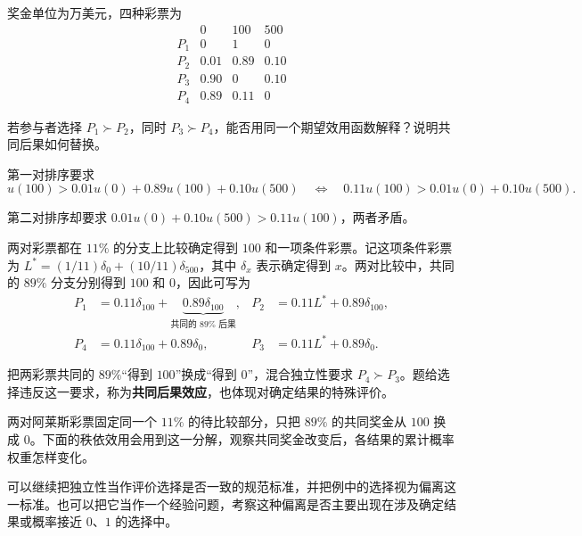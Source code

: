 \begin{tcolorbox}[example,title=课堂例题：两对抽奖的选择]
\begin{question}
奖金单位为万美元，四种彩票为
\[
\begin{array}{c|ccc}
 &0&100&500\\\hline
 P_1&0&1&0\\
 P_2&0.01&0.89&0.10\\
 P_3&0.90&0&0.10\\
 P_4&0.89&0.11&0
\end{array}
\]

若参与者选择 $P_1\succ P_2$，同时 $P_3\succ P_4$，能否用同一个期望效用函数解释？说明共同后果如何替换。
\end{question}
\begin{solution}[blank-type=manual,blank-vsep=6\baselineskip]
第一对排序要求
\[
 u(100)>0.01u(0)+0.89u(100)+0.10u(500)
 \quad\Longleftrightarrow\quad
 0.11u(100)>0.01u(0)+0.10u(500).
\]

第二对排序却要求 $0.01u(0)+0.10u(500)>0.11u(100)$，两者矛盾。

两对彩票都在 $11\%$ 的分支上比较确定得到 $100$ 和一项条件彩票。记这项条件彩票为 $L^\ast=(1/11)\delta_0+(10/11)\delta_{500}$，其中 $\delta_x$ 表示确定得到 $x$。两对比较中，共同的 $89\%$ 分支分别得到 $100$ 和 $0$，因此可写为
\[
\begin{aligned}
 P_1&=0.11\delta_{100}+\underbrace{0.89\delta_{100}}_{\text{共同的 }89\%\text{ 后果}},&
 P_2&=0.11L^\ast+0.89\delta_{100},\\
 P_4&=0.11\delta_{100}+0.89\delta_0,&
 P_3&=0.11L^\ast+0.89\delta_0.
\end{aligned}
\]

\begin{center}
\end{center}

把两彩票共同的 $89\%$“得到 $100$”换成“得到 $0$”，混合独立性要求 $P_4\succ P_3$。题给选择违反这一要求，称为\textbf{共同后果效应}，也体现对确定结果的特殊评价。
\end{solution}
\end{tcolorbox}

两对阿莱斯彩票固定同一个 $11\%$ 的待比较部分，只把 $89\%$ 的共同奖金从 $100$ 换成 $0$。下面的秩依效用会用到这一分解，观察共同奖金改变后，各结果的累计概率权重怎样变化。

可以继续把独立性当作评价选择是否一致的规范标准，并把例中的选择视为偏离这一标准。也可以把它当作一个经验问题，考察这种偏离是否主要出现在涉及确定结果或概率接近 $0$、$1$ 的选择中。

